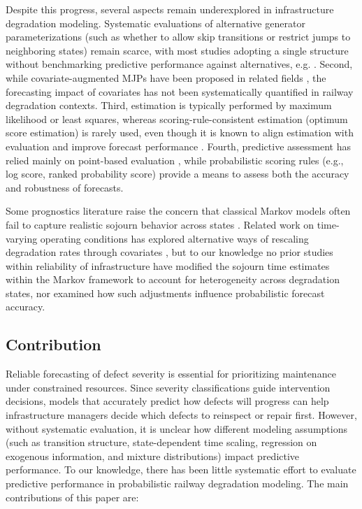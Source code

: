 \documentclass{article}
\begin{document}
Despite this progress, several aspects remain underexplored in infrastructure degradation modeling.
Systematic evaluations of alternative generator parameterizations (such as whether to allow skip transitions or restrict jumps to neighboring states) remain scarce, with most studies adopting a single structure without benchmarking predictive performance against alternatives, e.g. \citep{bisgaard2024A,Zbiciak2025}.
Second, while covariate-augmented MJPs have been proposed in related fields \citep{Wu2021ConditionPrediction}, the forecasting impact of covariates has not been systematically quantified in railway degradation contexts.
Third, estimation is typically performed by maximum likelihood or least squares, whereas scoring-rule-consistent estimation (optimum score estimation) is rarely used, even though it is known to align estimation with evaluation and improve forecast performance \citep{Gneiting2007,friedman1983a,Copas1983}.
Fourth, predictive assessment has relied mainly on point-based evaluation \citep{JimenezRoa2024Nonhomogeneous,Mizutani2023RegimeSwitching}, while probabilistic scoring rules (e.g., log score, ranked probability score) provide a means to assess both the accuracy and robustness of forecasts.

Some prognostics literature raise the concern that classical Markov models often fail to capture realistic sojourn behavior across states \citep{AIZPURUA2022}. Related work on time-varying operating conditions has explored alternative ways of rescaling degradation rates through covariates \citep{liu2024a,bisgaard2024A}, but to our knowledge no prior studies within reliability of infrastructure have modified the sojourn time estimates within the Markov framework to account for heterogeneity across degradation states, nor examined how such adjustments influence probabilistic forecast accuracy.
















\subsection{Contribution}
Reliable forecasting of defect severity is essential for prioritizing maintenance under constrained resources. Since severity classifications guide intervention decisions, models that accurately predict how defects will progress can help infrastructure managers decide which defects to reinspect or repair first. However, without systematic evaluation, it is unclear how different modeling assumptions (such as transition structure, state-dependent time scaling, regression on exogenous information, and mixture distributions) impact predictive performance. To our knowledge, there has been little systematic effort to evaluate predictive performance in probabilistic railway degradation modeling. 
The main contributions of this paper are:
\end{document}
